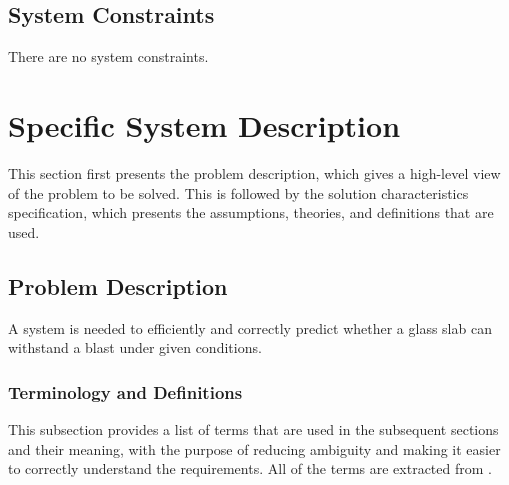 \documentclass[12pt]{article}
\begin{document}
\subsection{System Constraints}
\label{Sec:SysConstraints}
There are no system constraints.

\section{Specific System Description}
\label{Sec:SpecSystDesc}
This section first presents the problem description, which gives a high-level view of the problem to be solved. This is followed by the solution characteristics specification, which presents the assumptions, theories, and definitions that are used.

\subsection{Problem Description}
\label{Sec:ProbDesc}
A system is needed to efficiently and correctly predict whether a glass slab can withstand a blast under given conditions.

\subsubsection{Terminology and Definitions}
\label{Sec:TermDefs}
This subsection provides a list of terms that are used in the subsequent sections and their meaning, with the purpose of reducing ambiguity and making it easier to correctly understand the requirements. All of the terms are extracted from \cite{astm2009}.
\end{document}
